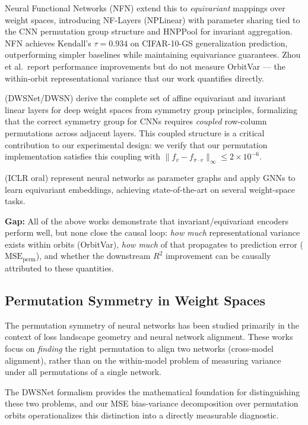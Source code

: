 Neural Functional Networks (NFN) \cite{Zhou2023Permutation} extend this to \emph{equivariant} mappings over weight spaces, introducing NF-Layers (NPLinear) with parameter sharing tied to the CNN permutation group structure and HNPPool for invariant aggregation. NFN achieves Kendall's $\tau = 0.934$ on CIFAR-10-GS generalization prediction, outperforming simpler baselines while maintaining equivariance guarantees. Zhou et al.\ report performance improvements but do not measure OrbitVar --- the within-orbit representational variance that our work quantifies directly.

\citet{Navon2023Equivariant} (DWSNet/DWSN) derive the complete set of affine equivariant and invariant linear layers for deep weight spaces from symmetry group principles, formalizing that the correct symmetry group for CNNs requires \emph{coupled} row-column permutations across adjacent layers. This coupled structure is a critical contribution to our experimental design: we verify that our permutation implementation satisfies this coupling with $\|f_v - f_{\pi \cdot v}\|_\infty \le 2 \times 10^{-6}$.

\citet{Kofinas2024Graph} (ICLR oral) represent neural networks as parameter graphs and apply GNNs to learn equivariant embeddings, achieving state-of-the-art on several weight-space tasks.

\textbf{Gap:} All of the above works demonstrate that invariant/equivariant encoders perform well, but none close the causal loop: \emph{how much} representational variance exists within orbits (OrbitVar), \emph{how much} of that propagates to prediction error ($\text{MSE}_\text{perm}$), and whether the downstream $R^2$ improvement can be causally attributed to these quantities.

\subsection{Permutation Symmetry in Weight Spaces}

The permutation symmetry of neural networks has been studied primarily in the context of loss landscape geometry \cite{Entezari2021Role,Ainsworth2022Git} and neural network alignment. These works focus on \emph{finding} the right permutation to align two networks (cross-model alignment), rather than on the within-model problem of measuring variance under all permutations of a single network.

The DWSNet formalism \cite{Navon2023Equivariant} provides the mathematical foundation for distinguishing these two problems, and our MSE bias-variance decomposition over permutation orbits operationalizes this distinction into a directly measurable diagnostic.

